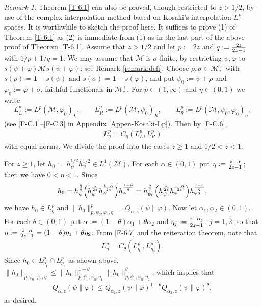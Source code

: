 \documentclass[12pt]{article}
\theoremstyle{definition}
\theoremstyle{remark}
\newtheorem{remark}[theorem]{Remark}
\numberwithin{equation}{section}
\def\Me{\mathcal M}
\def\ffi{\varphi}
\def\1{\mathbf{1}}
\begin{document}
\begin{remark}\label{remark:2nd-proof}
Theorem \ref{T-6.1} can also be proved, though restricted to $z>1/2$, by use of the complex
interpolation method based on Kosaki's interpolation $L^p$-spaces. It is worthwhile to sketch the
proof here. It suffices to prove (1) of Theorem \ref{T-6.1} as (2) is immediate from (1) as in the last
part of the above proof of Theorem \ref{T-6.1}. Assume that $z>1/2$ and let $p:=2z$ and
$q:={2z\over2z-1}$ with $1/p+1/q=1$. We may assume that $\Me$ is $\sigma$-finite, by restricting
$\psi,\ffi$ to $s(\psi+\ffi)\Me s(\psi+\ffi)$; see Remark \ref{remark:defi}. Choose $\rho,\sigma\in\Me_*^+$
with $s(\rho)=\1-s(\psi)$ and $s(\sigma)=\1-s(\ffi)$, and put $\psi_0:=\psi+\rho$ and $\ffi_0:=\ffi+\sigma$,
faithful functionals in $\Me_*^+$. For $p\in(1,\infty)$ and $\eta\in(0,1)$ we write
\[
L^p_L:=L^p(\Me,\ffi_0)_L,\qquad L^p_R:=L^p(\Me,\psi_0)_R,\qquad
L^p_\eta:=L^p(\Me,\psi_0,\ffi_0)_\eta,
\]
(see \eqref{F-C.1}--\eqref{F-C.3} in Appendix \ref{Appen-Kosaki-Lp}). Then by \eqref{F-C.6},
\begin{align}\label{F-6.7}
L^p_\eta=C_\eta(L^p_L,L^p_R)
\end{align}
with equal norms. We divide the proof into the cases $z\ge1$ and $1/2<z<1$.

For $z\ge1$, let $h_0:=h_\psi^{1/2}h_\ffi^{1/2}\in L^1(\Me)$. For each $\alpha\in(0,1)$ put
$\eta:={z-\alpha\over2z-1}$; then we have $0<\eta<1$. Since
\[
h_0=h_\psi^{\eta\over q}\Bigl(h_\psi^{\alpha\over2z}h_\ffi^{1-\alpha\over2z}\Bigr)
h_\ffi^{1-\eta\over q}
=h_{\psi_0}^{\eta\over q}\Bigl(h_\psi^{\alpha\over2z}h_\ffi^{1-\alpha\over2z}\Bigr)
h_{\ffi_0}^{1-\eta\over q},
\]
we have $h_0\in L^p_\eta$ and $\|h_0\|_{p,\psi_0,\ffi_0,\eta}^p=Q_{\alpha,z}(\psi\|\ffi)$. 
Now let $\alpha_1,\alpha_2\in(0,1)$. For each $\theta\in(0,1)$ put
$\alpha:=(1-\theta)\alpha_1+\theta\alpha_2$ and $\eta_j:={z-\alpha_j\over2z-1}$, $j=1,2$, so that
$\eta:={z-\alpha\over2z-1}=(1-\theta)\eta_1+\theta\eta_2$. From \eqref{F-6.7} and the reiteration
theorem, note that
\begin{align}\label{F-6.8}
L^p_\eta=C_\theta(L^p_{\eta_1},L^p_{\eta_2}).
\end{align}
Since $h_0\in L^p_{\eta_1}\cap L^p_{\eta_2}$ as shown above, $\|h_0\|_{p,\psi_0,\ffi_0,\eta}\le
\|h_0\|_{p,\psi_0,\ffi_0,\eta_1}^{1-\theta}\|h_0\|_{p,\psi_0,\ffi_0,\eta_2}^\theta$, which implies that
\begin{align}\label{F-6.9}
Q_{\alpha,z}(\psi\|\ffi)\le Q_{\alpha_1,z}(\psi\|\ffi)^{1-\theta}Q_{\alpha_2,z}(\psi\|\ffi)^\theta,
\end{align}
as desired.


\end{remark}
\end{document}
